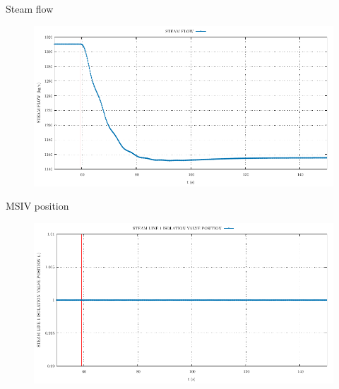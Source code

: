 %		
%	
%		
%	
%


\begin{frame}{Steam flow}
	\begin{figure}
		\centering
		\includegraphics[width=\textwidth]{./graphs/STEAM FLOW_comp.pdf}
		
	\end{figure}
	
\end{frame}

\begin{frame}{MSIV position}
	\begin{figure}
		\centering
		\includegraphics[width=\textwidth]{./graphs/STEAM LINE 1 ISOLATION VALVE POSITION_comp.pdf}
		
	\end{figure}
	
\end{frame}

